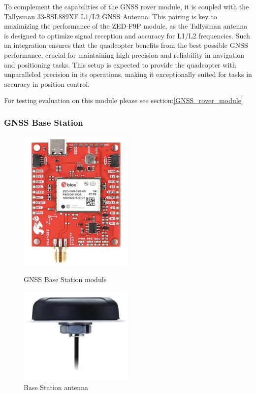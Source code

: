 \documentclass{article}
\begin{document}
To complement the capabilities of the GNSS rover module, it is coupled with the
Tallysman 33-SSL889XF L1/L2 GNSS Antenna. This pairing is key to maximizing the
performance of the ZED-F9P module, as the Tallysman antenna is designed to
optimize signal reception and accuracy for L1/L2 frequencies. Such an
integration ensures that the quadcopter benefits from the best possible GNSS
performance, crucial for maintaining high precision and reliability in
navigation and positioning tasks. This setup is expected to provide the
quadcopter with unparalleled precision in its operations, making it
exceptionally suited for tasks in accuracy in position control.

For testing evaluation on this module please see section:\ref{GNSS_rover_module}

\subsubsection{GNSS Base Station}
\begin{figure}[H]
  \begin{minipage}{0.5\textwidth}
    \centering
    \includegraphics[width=0.5\textwidth]{Pictures/gnss_base_station.png}
    \caption{GNSS Base Station module}
    \label{fig:gnss_base_station}
  \end{minipage}
  \begin{minipage}{0.5\textwidth}
    \centering
    \includegraphics[width=0.5\textwidth]{Pictures/base_station_antenna.png}
    \caption{Base Station antenna}
    \label{fig:base_station_antenna}
  \end{minipage}
\end{figure}
\end{document}
